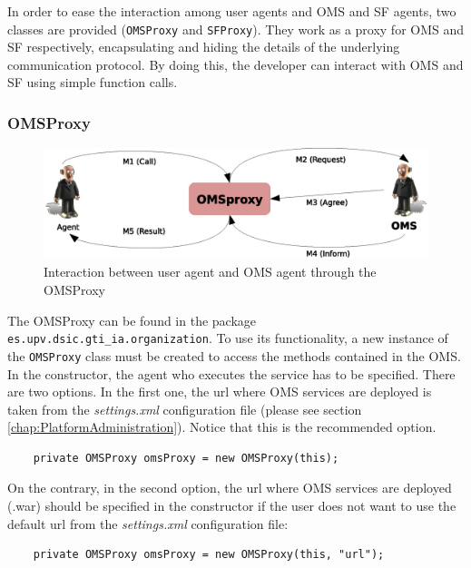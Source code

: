 In order to ease the interaction among user agents and OMS and SF agents, two classes are provided (\lstinline|OMSProxy| and \lstinline|SFProxy|). They work as a proxy for OMS and SF respectively, encapsulating and hiding the details of the underlying communication protocol. By doing this, the developer can interact with OMS and SF using simple function calls.

\subsubsection{OMSProxy}

\begin{figure}[h!t]
	\centering
	\includegraphics[width=1.0\textwidth]{Thomas/images/oms_omsProxy_interaction}
	\caption{Interaction between user agent and OMS agent through the OMSProxy}
\end{figure}

The OMSProxy can be found in the package \lstinline|es.upv.dsic.gti_ia.organization|. To use its functionality, a new instance of the \lstinline|OMSProxy| class must be created to access the methods contained in the OMS. In the constructor, the agent who executes the service has to be specified. There are two options. In the first one, the url where OMS services are deployed is taken from the \textit{settings.xml} configuration file (please see section \ref{chap:PlatformAdministration}). Notice that this is the recommended option.

\begin{lstlisting}
	private OMSProxy omsProxy = new OMSProxy(this);
\end{lstlisting}

On the contrary, in the second option, the url where OMS services are deployed (.war) should be specified in the constructor if the user does not want to use the default url from the \textit{settings.xml} configuration file:

\begin{lstlisting}
	private OMSProxy omsProxy = new OMSProxy(this, "url");
\end{lstlisting}


